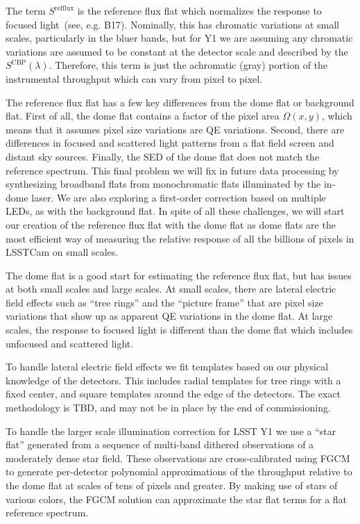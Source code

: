 \documentclass[SE,authoryear,lsstdraft,toc]{lsstdoc}
\begin{document}
The term $S^{\mathrm{refflux}}$ is the reference flux flat which normalizes the response to focused light~(see, e.g. B17).
Nominally, this has chromatic variations at small scales, particularly in the bluer bands, but for Y1 we are assuming any chromatic variations are assumed to be constant at the detector scale and described by the $S^{\mathrm{CBP}}(\lambda)$.
Therefore, this term is just the achromatic (gray) portion of the instrumental throughput which can vary from pixel to pixel.

The reference flux flat has a few key differences from the dome flat or background flat.
First of all, the dome flat contains a factor of the pixel area $\Omega(x, y)$, which means that it assumes pixel size variations are QE variations.
Second, there are differences in focused and scattered light patterns from a flat field screen and distant sky sources.
Finally, the SED of the dome flat does not match the reference spectrum.
This final problem we will fix in future data processing by synthesizing broadband flats from monochromatic flats illuminated by the in-dome laser.
We are also exploring a first-order correction based on multiple LEDs, as with the background flat.
In spite of all these challenges, we will start our creation of the reference flux flat with the dome flat as dome flats are the most efficient way of measuring the relative response of all the billions of pixels in LSSTCam on small scales.

The dome flat is a good start for estimating the reference flux flat, but has issues at both small scales and large scales.
At small scales, there are lateral electric field effects such as ``tree rings'' and the ``picture frame'' that are pixel size variations that show up as apparent QE variations in the dome flat.
At large scales, the response to focused light is different than the dome flat which includes unfocused and scattered light.

To handle lateral electric field effects we fit templates based on our physical knowledge of the detectors.
This includes radial templates for tree rings with a fixed center, and square templates around the edge of the detectors.
The exact methodology is TBD, and may not be in place by the end of commissioning.

To handle the larger scale illumination correction for LSST Y1 we use a ``star flat'' generated from a sequence of multi-band dithered observations of a moderately dense star field.
These observations are cross-calibrated using FGCM to generate per-detector polynomial approximations of the throughput relative to the dome flat at scales of tens of pixels and greater.
By making use of stars of various colors, the FGCM solution can approximate the star flat terms for a flat reference spectrum.
\end{document}
